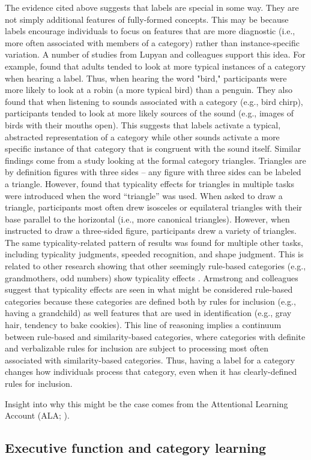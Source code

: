 \documentclass[../dissertation.tex]{subfiles}
\begin{document}
	The evidence cited above suggests that labels are special in some way. They are not simply additional features of fully-formed concepts. This may be because labels encourage individuals to focus on features that are more diagnostic (i.e., more often associated with members of a category) rather than instance-specific variation. A number of studies from Lupyan and colleagues support this idea. For example, \citet{Edmiston2015} found that adults tended to look at more typical instances of a category when hearing a label. Thus, when hearing the word "bird," participants were more likely to look at a robin (a more typical bird) than a penguin. They also found that when listening to sounds associated with a category (e.g., bird chirp), participants tended to look at more likely sources of the sound (e.g., images of birds with their mouths open). This suggests that labels activate a typical, abstracted representation of a category while other sounds activate a more specific instance of that category that is congruent with the sound itself. Similar findings come from a study looking at the formal category triangles. Triangles are by definition figures with three sides – any figure with three sides can be labeled a triangle. However, \citet{Lupyan2017} found that typicality effects for triangles in multiple tasks were introduced when the word “triangle” was used. When asked to draw a triangle, participants most often drew isosceles or equilateral triangles with their base parallel to the horizontal (i.e., more canonical triangles). However, when instructed to draw a three-sided figure, participants drew a variety of triangles. The same typicality-related pattern of results was found for multiple other tasks, including typicality judgments, speeded recognition, and shape judgment. This is related to other research showing that other seemingly rule-based categories (e.g., grandmothers, odd numbers) show typicality effects \citep{Armstrong1983,Lupyan2013a}. Armstrong and colleagues suggest that typicality effects are seen in what might be considered rule-based categories because these categories are defined both by rules for inclusion (e.g., having a grandchild) as well features that are used in identification (e.g., gray hair, tendency to bake cookies). This line of reasoning implies a continuum between rule-based and similarity-based categories, where categories with definite and verbalizable rules for inclusion are subject to processing most often associated with similarity-based categories. Thus, having a label for a category changes how individuals process that category, even when it has clearly-defined rules for inclusion. \par
	Insight into why this might be the case comes from the Attentional Learning Account (ALA; \citealp{Smith2002,Yoshida2005}).
	

\subsection{Executive function and category learning}
\end{document}
